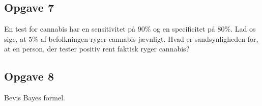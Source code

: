 \subsection*{Opgave 7}

En test for cannabis har en sensitivitet på $90\%$ og en specificitet på $80\%$. Lad os sige, at $5\%$ af befolkningen ryger cannabis jævnligt. Hvad er sandsynligheden for, at en person, der tester positiv rent faktisk ryger cannabis?

\subsection*{Opgave 8}
Bevis Bayes formel.
